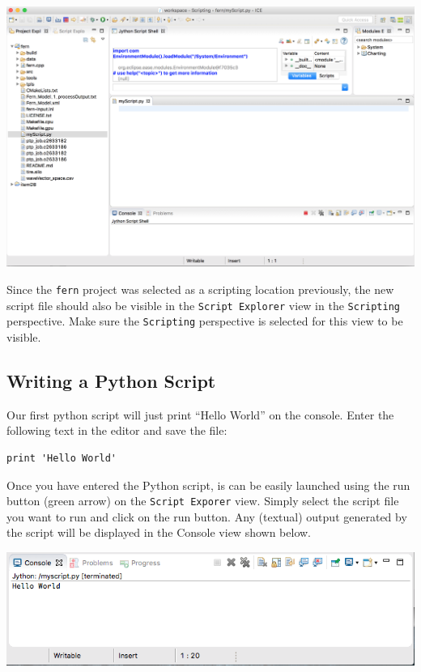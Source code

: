 \begin{center} \includegraphics[width=\textwidth]{images/editor}
\end{center}

Since the \texttt{fern} project was selected as a scripting location
previously, the new script file should also be visible in the \texttt{Script
Explorer} view in the \texttt{Scripting} perspective. Make sure the
\texttt{Scripting} perspective is selected for this view to be visible.

\subsection{Writing a Python Script}

Our first python script will just print ``Hello World'' on the console. Enter
the following text in the editor and save the file:

\begin{verbatim}
print 'Hello World'
\end{verbatim}

Once you have entered the Python script, is can be easily launched using the run
button (green arrow) on the \texttt{Script Exporer} view. Simply select the
script file you want to run and click on the run button. Any (textual)
output generated by the script will be displayed in the Console view shown
below.

\begin{center} \includegraphics[width=\textwidth]{images/console}
\end{center}

